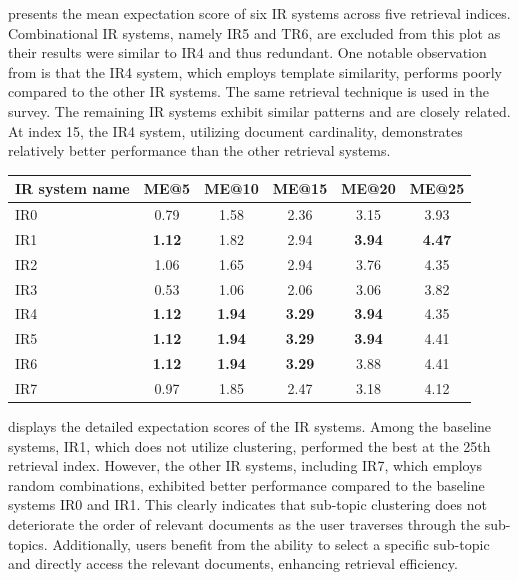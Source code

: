  presents the mean expectation score of six \ac{IR} systems across five retrieval indices. Combinational IR systems, namely IR5 and TR6, are excluded from this plot as their results were similar to IR4 and thus redundant. One notable observation from  is that the IR4 system, which employs template similarity, performs poorly compared to the other IR systems. The same retrieval technique is used in the survey. The remaining IR systems exhibit similar patterns and are closely related. At index 15, the IR4 system, utilizing document cardinality, demonstrates relatively better performance than the other retrieval systems.


\begin{center}
	\label{tab:mae_results}
	\begin{tabularx}{0.8\textwidth}{|Y|c|c|c|c|c|}
		\hline
		IR system name & ME@5 & ME@10 & ME@15 & ME@20 & ME@25 \\
\hline
IR0 &          0.79 &           1.58 &           2.36 &           3.15 &           3.93 \\ \hline 
IR1 &          \textbf{1.12} &           1.82 &           2.94 &          \textbf{3.94} &           \textbf{4.47} \\ \hline
IR2 &          1.06 &           1.65 &           2.94 &           3.76 &           4.35 \\ \hline
IR3 &          0.53 &           1.06 &           2.06 &           3.06 &           3.82 \\ \hline
IR4 &           \textbf{1.12}  &            \textbf{1.94}  &          \textbf{3.29} &           \textbf{3.94} &           4.35 \\ \hline
IR5 &           \textbf{1.12}  &           \textbf{1.94} &           \textbf{3.29} &       \textbf{3.94}&           4.41 \\ \hline
IR6 &          \textbf{1.12}  &           \textbf{1.94} &           \textbf{3.29} &           3.88 &           4.41 \\ \hline
IR7 &          0.97 &           1.85 &           2.47 &           3.18 &           4.12 \\ \hline
	\end{tabularx}
\end{center}

 displays the detailed expectation scores of the \ac{IR} systems. Among the baseline systems, IR1, which does not utilize clustering, performed the best at the 25th retrieval index. However, the other \ac{IR} systems, including IR7, which employs random combinations, exhibited better performance compared to the baseline systems IR0 and IR1. This clearly indicates that sub-topic clustering does not deteriorate the order of relevant documents as the user traverses through the sub-topics. Additionally, users benefit from the ability to select a specific sub-topic and directly access the relevant documents, enhancing retrieval efficiency.

